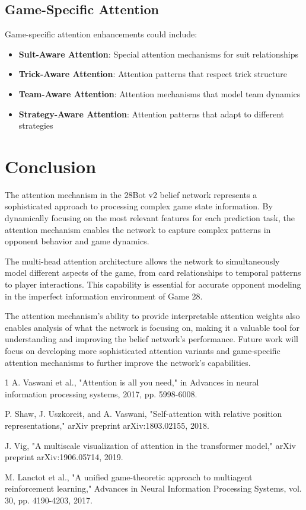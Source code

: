 \documentclass[conference]{IEEEtran}
\begin{document}
\subsection{Game-Specific Attention}

Game-specific attention enhancements could include:

\begin{itemize}
    \item \textbf{Suit-Aware Attention}: Special attention mechanisms for suit relationships
    \item \textbf{Trick-Aware Attention}: Attention patterns that respect trick structure
    \item \textbf{Team-Aware Attention}: Attention mechanisms that model team dynamics
    \item \textbf{Strategy-Aware Attention}: Attention patterns that adapt to different strategies
\end{itemize}

\section{Conclusion}

The attention mechanism in the 28Bot v2 belief network represents a sophisticated approach to processing complex game state information. By dynamically focusing on the most relevant features for each prediction task, the attention mechanism enables the network to capture complex patterns in opponent behavior and game dynamics.

The multi-head attention architecture allows the network to simultaneously model different aspects of the game, from card relationships to temporal patterns to player interactions. This capability is essential for accurate opponent modeling in the imperfect information environment of Game 28.

The attention mechanism's ability to provide interpretable attention weights also enables analysis of what the network is focusing on, making it a valuable tool for understanding and improving the belief network's performance. Future work will focus on developing more sophisticated attention variants and game-specific attention mechanisms to further improve the network's capabilities.

\begin{thebibliography}{1}
A. Vaswani et al., "Attention is all you need," in Advances in neural information processing systems, 2017, pp. 5998-6008.

P. Shaw, J. Uszkoreit, and A. Vaswani, "Self-attention with relative position representations," arXiv preprint arXiv:1803.02155, 2018.

J. Vig, "A multiscale visualization of attention in the transformer model," arXiv preprint arXiv:1906.05714, 2019.

M. Lanctot et al., "A unified game-theoretic approach to multiagent reinforcement learning," Advances in Neural Information Processing Systems, vol. 30, pp. 4190-4203, 2017.

\end{thebibliography}
\end{document}
